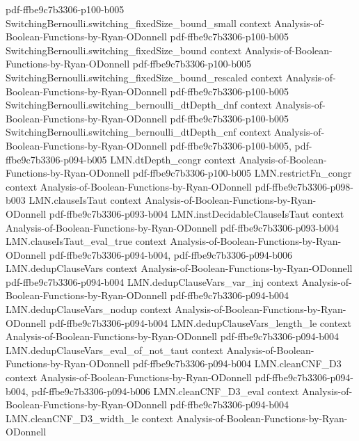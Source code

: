 \begin{theorem}
  {pdf-ffbe9c7b3306-p100-b005}
\proofstep
  {SwitchingBernoulli.switching_fixedSize_bound_small}
  {context}
  {Analysis-of-Boolean-Functions-by-Ryan-ODonnell}
  {pdf-ffbe9c7b3306-p100-b005}
\proofstep
  {SwitchingBernoulli.switching_fixedSize_bound}
  {context}
  {Analysis-of-Boolean-Functions-by-Ryan-ODonnell}
  {pdf-ffbe9c7b3306-p100-b005}
\proofstep
  {SwitchingBernoulli.switching_fixedSize_bound_rescaled}
  {context}
  {Analysis-of-Boolean-Functions-by-Ryan-ODonnell}
  {pdf-ffbe9c7b3306-p100-b005}
\proofstep
  {SwitchingBernoulli.switching_bernoulli_dtDepth_dnf}
  {context}
  {Analysis-of-Boolean-Functions-by-Ryan-ODonnell}
  {pdf-ffbe9c7b3306-p100-b005}
\proofstep
  {SwitchingBernoulli.switching_bernoulli_dtDepth_cnf}
  {context}
  {Analysis-of-Boolean-Functions-by-Ryan-ODonnell}
  {pdf-ffbe9c7b3306-p100-b005,
    pdf-ffbe9c7b3306-p094-b005}
\proofstep
  {LMN.dtDepth_congr}
  {context}
  {Analysis-of-Boolean-Functions-by-Ryan-ODonnell}
  {pdf-ffbe9c7b3306-p100-b005}
\proofstep
  {LMN.restrictFn_congr}
  {context}
  {Analysis-of-Boolean-Functions-by-Ryan-ODonnell}
  {pdf-ffbe9c7b3306-p098-b003}
\proofstep
  {LMN.clauseIsTaut}
  {context}
  {Analysis-of-Boolean-Functions-by-Ryan-ODonnell}
  {pdf-ffbe9c7b3306-p093-b004}
\proofstep
  {LMN.instDecidableClauseIsTaut}
  {context}
  {Analysis-of-Boolean-Functions-by-Ryan-ODonnell}
  {pdf-ffbe9c7b3306-p093-b004}
\proofstep
  {LMN.clauseIsTaut_eval_true}
  {context}
  {Analysis-of-Boolean-Functions-by-Ryan-ODonnell}
  {pdf-ffbe9c7b3306-p094-b004,
    pdf-ffbe9c7b3306-p094-b006}
\proofstep
  {LMN.dedupClauseVars}
  {context}
  {Analysis-of-Boolean-Functions-by-Ryan-ODonnell}
  {pdf-ffbe9c7b3306-p094-b004}
\proofstep
  {LMN.dedupClauseVars_var_inj}
  {context}
  {Analysis-of-Boolean-Functions-by-Ryan-ODonnell}
  {pdf-ffbe9c7b3306-p094-b004}
\proofstep
  {LMN.dedupClauseVars_nodup}
  {context}
  {Analysis-of-Boolean-Functions-by-Ryan-ODonnell}
  {pdf-ffbe9c7b3306-p094-b004}
\proofstep
  {LMN.dedupClauseVars_length_le}
  {context}
  {Analysis-of-Boolean-Functions-by-Ryan-ODonnell}
  {pdf-ffbe9c7b3306-p094-b004}
\proofstep
  {LMN.dedupClauseVars_eval_of_not_taut}
  {context}
  {Analysis-of-Boolean-Functions-by-Ryan-ODonnell}
  {pdf-ffbe9c7b3306-p094-b004}
\proofstep
  {LMN.cleanCNF_D3}
  {context}
  {Analysis-of-Boolean-Functions-by-Ryan-ODonnell}
  {pdf-ffbe9c7b3306-p094-b004,
    pdf-ffbe9c7b3306-p094-b006}
\proofstep
  {LMN.cleanCNF_D3_eval}
  {context}
  {Analysis-of-Boolean-Functions-by-Ryan-ODonnell}
  {pdf-ffbe9c7b3306-p094-b004}
\proofstep
  {LMN.cleanCNF_D3_width_le}
  {context}
  {Analysis-of-Boolean-Functions-by-Ryan-ODonnell}

\end{theorem}

